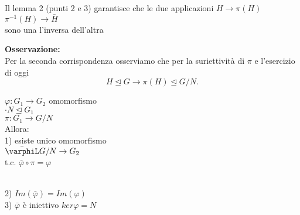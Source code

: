 \documentclass[12px]{article}
\begin{document}
	  \begin{dimo}
		  Il lemma 2 (punti 2 e 3) garantisce che le due applicazioni $H \rightarrow \pi(H)$ $\pi^{-1}(H) \rightarrow\bar H$\\
		  sono una l'inversa dell'altra
	  \end{dimo}
	  \textbf{Osservazione:}\\
	  Per la seconda corrispondenza osserviamo che per la suriettività di $\pi$ e l'esercizio di oggi \\
	  \[
	  H\trianglelefteq G \rightarrow \pi (H)\trianglelefteq G/N
	  .\] 
	  \begin{teo}
	  	$ \varphi:G_1 \rightarrow G_2$ omomorfismo\\
		$\cdot N\trianglelefteq G_1$\\
		$\pi:G_1 \rightarrow G/N$\\
		Allora:\\
		1) esiste unico omomorfismo\\
		$\bar\varphiL G/N \rightarrow G_2$\\
		t.c. $ \bar  \varphi\circ \pi = \varphi$
		 \\
2) $Im (\bar \varphi) = Im ( \varphi)$\\
3) $ \bar \varphi$ è iniettivo \Leftrightarrow $ker\varphi = N$
	  \end{teo}
\end{document}
